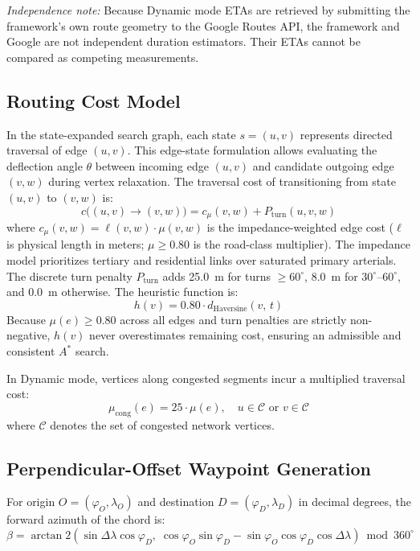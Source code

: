 \documentclass[11pt,conference]{IEEEtran}
\begin{document}
\textit{Independence note:} Because Dynamic mode ETAs are retrieved by submitting the framework's own route geometry to the Google Routes API, the framework and Google are not independent duration estimators. Their ETAs cannot be compared as competing measurements.

\subsection{Routing Cost Model}

In the state-expanded search graph, each state $s = (u, v)$ represents directed traversal of edge $(u, v)$.
This edge-state formulation allows evaluating the deflection angle $\theta$ between incoming edge $(u, v)$ and candidate outgoing edge $(v, w)$ during vertex relaxation.
The traversal cost of transitioning from state $(u,v)$ to $(v,w)$ is:
\begin{equation}
  c\bigl((u,v)\to(v,w)\bigr) = c_\mu(v,w) + P_\text{turn}(u,v,w)
  \label{eq:astar_cost}
\end{equation}
where $c_\mu(v,w) = \ell(v,w)\cdot\mu(v,w)$ is the impedance-weighted edge cost ($\ell$ is physical length in meters; $\mu \ge 0.80$ is the road-class multiplier).
The impedance model prioritizes tertiary and residential links over saturated primary arterials.
The discrete turn penalty $P_\text{turn}$ adds 25.0~m for turns $\ge 60^\circ$, 8.0~m for $30^\circ$--$60^\circ$, and 0.0~m otherwise.
The heuristic function is:
\begin{equation}
  h(v) = 0.80 \cdot d_\text{Haversine}(v,\, t)
  \label{eq:heuristic}
\end{equation}
Because $\mu(e) \ge 0.80$ across all edges and turn penalties are strictly non-negative, $h(v)$ never overestimates remaining cost, ensuring an admissible and consistent $A^*$ search.

In Dynamic mode, vertices along congested segments incur a multiplied traversal cost:
\begin{equation}
  \mu_\text{cong}(e) = 25 \cdot \mu(e), \quad u \in \mathcal{C} \text{ or } v \in \mathcal{C}
  \label{eq:congestion}
\end{equation}
where $\mathcal{C}$ denotes the set of congested network vertices.

\subsection{Perpendicular-Offset Waypoint Generation}

For origin $O=(\varphi_O,\lambda_O)$ and destination $D=(\varphi_D,\lambda_D)$ in decimal degrees, the forward azimuth of the chord is:
\begin{equation}
  \beta = \arctan2\!\left(\sin\Delta\lambda\cos\varphi_D,\;
         \cos\varphi_O\sin\varphi_D - \sin\varphi_O\cos\varphi_D\cos\Delta\lambda\right) \bmod 360^\circ
  \label{eq:bearing}
\end{equation}
\end{document}
